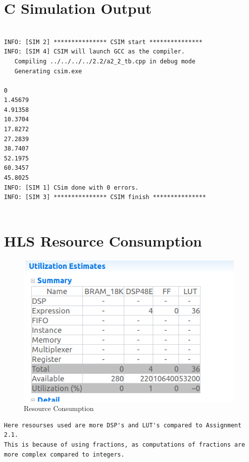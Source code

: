 \documentclass{article}
\begin{document}
\section{C Simulation Output}
\begin{lstlisting}

INFO: [SIM 2] *************** CSIM start ***************
INFO: [SIM 4] CSIM will launch GCC as the compiler.
   Compiling ../../../../2.2/a2_2_tb.cpp in debug mode
   Generating csim.exe

0
1.45679
4.91358
10.3704
17.8272
27.2839
38.7407
52.1975
60.3457
45.8025
INFO: [SIM 1] CSim done with 0 errors.
INFO: [SIM 3] *************** CSIM finish ***************


\end{lstlisting}
\vspace{15cm}


\section{HLS Resource Consumption}
\vspace{3cm}
\begin{figure}[h]
    \centering
\includegraphics[width=\columnwidth]{figs/Resource_Consumption.png}
    \caption{Resource Consumption}
    \label{fig:my_label}
\end{figure}
\begin{lstlisting}
Here resourses used are more DSP's and LUT's compared to Assignment 2.1. 
This is because of using fractions, as computations of fractions are 
more complex compared to integers.
\end{lstlisting}
\vspace{5cm}
\end{document}
